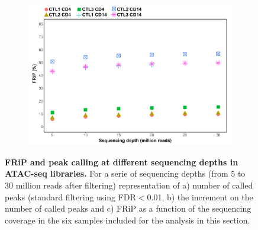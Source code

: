 \begin{figure}[htbp]
\begin{subfigure}{0.45\textwidth}
\includegraphics[width=\textwidth]{./Results1/pdfs/ATAC_Core_fresh_CD4_CD14_frac_reads_in_peaks_vs_depth}
\caption{\textbf{}}
\end{subfigure}
\caption[FRiP and peak calling at different sequencing depths in ATAC-seq libraries.]{\textbf{FRiP and peak calling at different sequencing depths in ATAC-seq libraries.} For a serie of sequencing depths (from 5 to 30 million reads after filtering) representation of a) number of called peaks (standard filtering using FDR$<$0.01, b) the increment on the number of called peaks and c)  FRiP as a function of the sequencing coverage in the six samples included for the analysis in this section.}
\label{fig:Peak_calling_versus_depth_ATAC}
\end{figure} 



